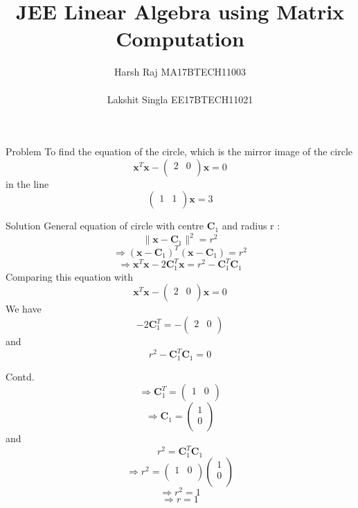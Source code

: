 \documentclass[10pt]{beamer}
\title{JEE Linear Algebra using Matrix Computation}
\author{Harsh Raj  MA17BTECH11003 \\ \\ Lakshit Singla EE17BTECH11021}
\date{}
\begin{document}
\begin{frame}{}
\maketitle
\end{frame}


\begin{frame}[fragile]{Problem}
To find the equation of the circle, which is the mirror image of the circle
\[
\textbf{x}^{T}\textbf{x}  - \left( {\begin{array}{cc}
   2 & 0 \\
  \end{array} } \right)\textbf{x}=0
  \]
  in the line
  \[
   \left( {\begin{array}{cc}
   1 & 1 \\
  \end{array} } \right)\textbf{x}=3
  \]

\end{frame}


\begin{frame}[fragile]{Solution}
  General equation of circle with centre \( \textbf{C}_1\) and radius r :
\[\|\textbf{x}-\textbf{C}_1\|^2 = r^2
\] 
\[\Rightarrow
     (\textbf{x}-\textbf{C}_1)^{T}(\textbf{x}-\textbf{C}_1) = r^2
 \]
 \[ \Rightarrow
  \textbf{x}^{T}\textbf{x}-2\textbf{C}_1^{T}\textbf{x}=r^2-\textbf{C}_1^{T}\textbf{C}_1
\]
Comparing this equation with
\[ \textbf{x}^{T}\textbf{x}  - \left( {\begin{array}{cc}
   2 & 0 \\
  \end{array} } \right)\textbf{x}=0
\]
We have
\[ -2\textbf{C}_1^{T} = -  \left( {\begin{array}{cc}
   2 & 0 \\
  \end{array} } \right)
\]
and
\[
r^2 - \textbf{C}_1^{T}\textbf{C}_1 = 0
\]
\end{frame}


\begin{frame}{Contd.}
\[\Rightarrow
\textbf{C}_1^{T} =  \left( {\begin{array}{cc}
   1 & 0 \\
  \end{array} } \right)
\]
\[\Rightarrow
\textbf{C}_1 =  \left( {\begin{array}{c}
   1 \\
   0 \\
   \end{array} } \right)
\]
and
\[
r^2 = \textbf{C}_1^{T}\textbf{C}_1
\]
\[\Rightarrow
r^2 = \left( {\begin{array}{cc}
   1 & 0 \\
  \end{array} } \right)\left( {\begin{array}{c}
   1 \\
   0 \\
   \end{array} } \right)
\]
\[\Rightarrow
r^2 = 1
\]
\[\Rightarrow
r = 1
\]

\end{frame}
\end{document}
